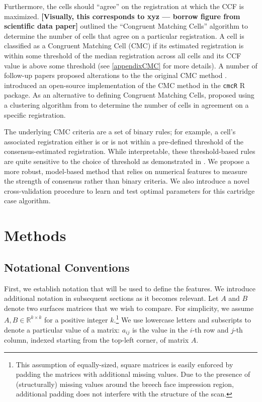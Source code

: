 \documentclass[reprint]{JASA}
\begin{document}
Furthermore, the cells should ``agree'' on the registration at which the
CCF is maximized. \textbf{{[}Visually, this corresponds to xyz ---
borrow figure from scientific data paper{]}} \citet{song_proposed_2013}
outlined the ``Congruent Matching Cells'' algorithm to determine the
number of cells that agree on a particular registration. A cell is
classified as a Congruent Matching Cell (CMC) if its estimated
registration is within some threshold of the median registration across
all cells and its CCF value is above some threshold (see
\ref{appendixCMC} for more details). A number of follow-up papers
proposed alterations to the the original CMC method
\citep{tong_improved_2015, chen_convergence_2017}. \citet{cmcR}
introduced an open-source implementation of the CMC method in the
\texttt{cmcR} R package. As an alternative to defining Congruent
Matching Cells, \citet{zhang_convergence_2021} proposed using a
clustering algorithm from \citet{Ester1996} to determine the number of
cells in agreement on a specific registration.

The underlying CMC criteria are a set of binary rules; for example, a
cell's associated registration either is or is not within a pre-defined
threshold of the consensus-estimated registration. While interpretable,
these threshold-based rules are quite sensitive to the choice of
threshold as demonstrated in \citet{Zemmels2023}. We propose a more
robust, model-based method that relies on numerical features to measure
the strength of consensus rather than binary criteria. We also introduce
a novel cross-validation procedure to learn and test optimal parameters
for this cartridge case algorithm.

\hypertarget{methods}{%
\section{Methods}\label{methods}}

\hypertarget{notational-conventions}{%
\subsection{Notational Conventions}\label{notational-conventions}}

First, we establish notation that will be used to define the features.
We introduce additional notation in subsequent sections as it becomes
relevant. Let \(A\) and \(B\) denote two surfaces matrices that we wish
to compare. For simplicity, we assume
\(A,B \in \mathbb{R}^{k \times k}\) for a positive integer
\(k\).\footnote{This assumption of equally-sized, square matrices is easily enforced by padding the matrices with additional missing values.
Due to the presence of (structurally) missing values around the breech face impression region, additional padding does not interfere with the structure of the scan.}
We use lowercase letters and subscripts to denote a particular value of
a matrix: \(a_{ij}\) is the value in the \(i\)-th row and \(j\)-th
column, indexed starting from the top-left corner, of matrix \(A\).
\end{document}
